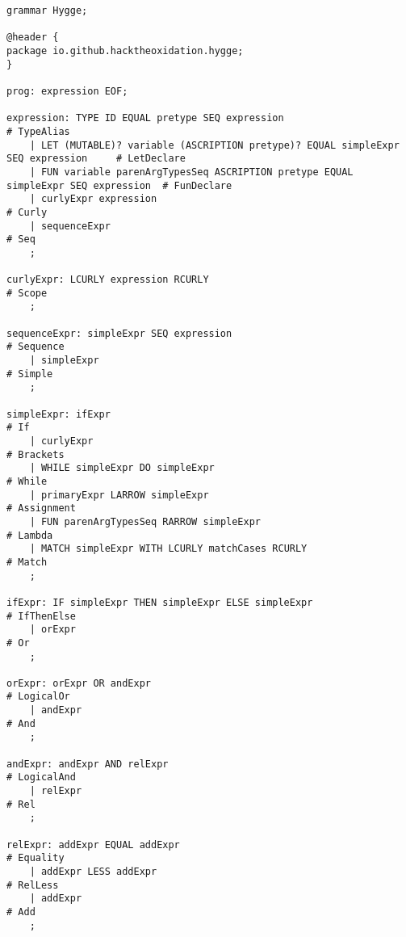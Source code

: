\begin{lstlisting}
grammar Hygge;

@header {
package io.github.hacktheoxidation.hygge;
}

prog: expression EOF;

expression: TYPE ID EQUAL pretype SEQ expression                                        # TypeAlias
    | LET (MUTABLE)? variable (ASCRIPTION pretype)? EQUAL simpleExpr SEQ expression     # LetDeclare
    | FUN variable parenArgTypesSeq ASCRIPTION pretype EQUAL simpleExpr SEQ expression  # FunDeclare
    | curlyExpr expression                                                              # Curly
    | sequenceExpr                                                                      # Seq
    ;

curlyExpr: LCURLY expression RCURLY                                       # Scope
    ;

sequenceExpr: simpleExpr SEQ expression                                   # Sequence
    | simpleExpr                                                          # Simple
    ;

simpleExpr: ifExpr                                                        # If
    | curlyExpr                                                           # Brackets
    | WHILE simpleExpr DO simpleExpr                                      # While
    | primaryExpr LARROW simpleExpr                                       # Assignment
    | FUN parenArgTypesSeq RARROW simpleExpr                              # Lambda
    | MATCH simpleExpr WITH LCURLY matchCases RCURLY                      # Match
    ;

ifExpr: IF simpleExpr THEN simpleExpr ELSE simpleExpr                     # IfThenElse
    | orExpr                                                              # Or
    ;

orExpr: orExpr OR andExpr                                                 # LogicalOr
    | andExpr                                                             # And
    ;

andExpr: andExpr AND relExpr                                              # LogicalAnd
    | relExpr                                                             # Rel
    ;

relExpr: addExpr EQUAL addExpr                                            # Equality
    | addExpr LESS addExpr                                                # RelLess
    | addExpr                                                             # Add
    ;


\end{lstlisting}
